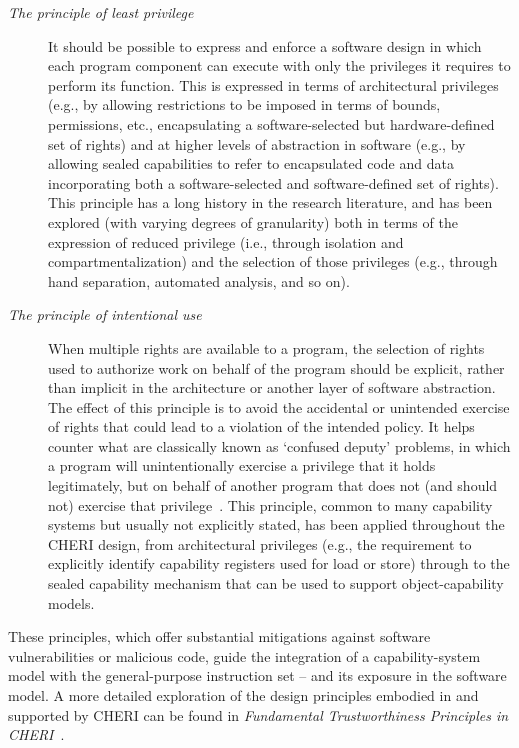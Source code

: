 \begin{description}
\item[\textit{The principle of least privilege}] It should be possible to
  express and enforce a software design in which each program component can execute
  with only the privileges it requires to perform its function.
  This is expressed in terms of architectural privileges (e.g., by allowing
  restrictions to be imposed in terms of bounds, permissions, etc.,
  encapsulating a software-selected but hardware-defined set of rights) and at
  higher levels of abstraction in software (e.g., by allowing sealed
  capabilities to refer to encapsulated code and data incorporating both a
  software-selected and software-defined set of rights).
  This principle has a long history in the research literature, and has been
  explored (with varying degrees of granularity) both in terms of the expression
  of reduced privilege (i.e., through isolation and compartmentalization) and
  the selection of those privileges (e.g., through hand separation, automated
  analysis, and so on).

\item[\textit{The principle of intentional use}]  When multiple rights
  are available to a program, the selection of rights used to authorize work
  on behalf of the program should be explicit, rather than implicit in the
  architecture or another layer of software abstraction.
  The effect of this principle is to avoid the accidental or unintended
  exercise of rights that could lead to a violation of the intended policy.
  It helps counter what are classically known as
  `confused deputy' problems, in which a program will unintentionally exercise
  a privilege that it holds legitimately, but on behalf of another program
  that does not (and should not) exercise that privilege~\cite{Hardy1988}.
  This principle, common to many capability systems but usually not explicitly
  stated, has been applied throughout the CHERI design, from architectural
  privileges (e.g., the requirement to explicitly identify capability
  registers used for load or store) through to the sealed capability mechanism
  that can be used to support object-capability models.
\end{description}

\noindent
These principles, which offer
substantial mitigations against
 software vulnerabilities or malicious code, guide the integration
of a capability-system model with the general-purpose instruction set -- and
its exposure in the software model.
A more detailed exploration of the design principles embodied in and supported
by CHERI can be found in \textit{Fundamental Trustworthiness Principles in
CHERI}~\cite{neumann2017:cheri-principles}.

